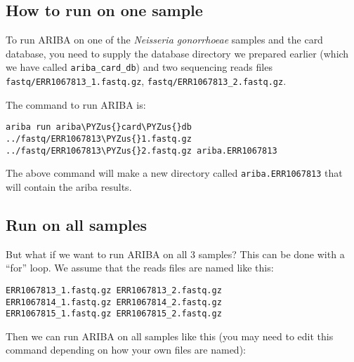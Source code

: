 \documentclass[11pt]{article}
\makeatletter
\def\PYZus{\char`\_}
\newcommand{\boxspacing}{\kern\kvtcb@left@rule\kern\kvtcb@boxsep}
\newcommand{\prompt}[4]{
         {\ttfamily\llap{{\color{blue}\LARGE\faKeyboardO\hspace{3pt}#4}}\vspace{-\baselineskip}}
    }
\makeatother
\begin{document}
    \hypertarget{how-to-run-on-one-sample}{%
\subsection{How to run on one sample}\label{how-to-run-on-one-sample}}

To run ARIBA on one of the \textit{Neisseria gonorrhoeae} samples and the
card database, you need to supply the database directory we prepared
earlier (which we have called \texttt{ariba\_card\_db}) and two
sequencing reads files \texttt{fastq/ERR1067813\_1.fastq.gz},
\texttt{fastq/ERR1067813\_2.fastq.gz}.

The command to run ARIBA is:

    \begin{tcolorbox}[breakable, size=fbox, boxrule=1pt, pad at break*=1mm,colback=cellbackground, colframe=cellborder]
\prompt{In}{incolor}{ }{\boxspacing}
\begin{Verbatim}[commandchars=\\\{\}]
ariba run ariba\PYZus{}card\PYZus{}db ../fastq/ERR1067813\PYZus{}1.fastq.gz ../fastq/ERR1067813\PYZus{}2.fastq.gz ariba.ERR1067813
\end{Verbatim}
\end{tcolorbox}

    The above command will make a new directory called
\texttt{ariba.ERR1067813} that will contain the ariba results.

    \hypertarget{run-on-all-samples}{%
\subsection{Run on all samples}\label{run-on-all-samples}}

But what if we want to run ARIBA on all 3 samples? This can be done with
a ``for'' loop. We assume that the reads files are named like this:

\begin{verbatim}
ERR1067813_1.fastq.gz ERR1067813_2.fastq.gz
ERR1067814_1.fastq.gz ERR1067814_2.fastq.gz
ERR1067815_1.fastq.gz ERR1067815_2.fastq.gz
\end{verbatim}

Then we can run ARIBA on all samples like this (you may need to edit
this command depending on how your own files are named):
\end{document}
